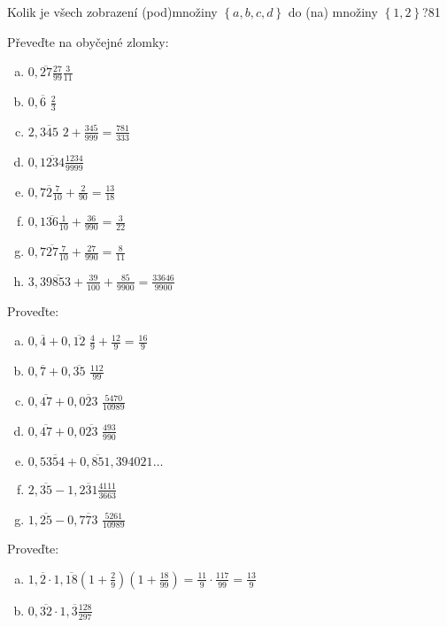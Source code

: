 \begin{example}[SÚM 174/46]
  Kolik je všech zobrazení (pod)množiny $\left\{a,b,c,d\right\}$ do (na) množiny $\left\{1,2\right\}$?\hfill \rm 81
\end{example}

\begin{example}[SÚM 106/20]
  Převeďte na obyčejné zlomky:
  \begin{enumerate}[a.]
    \item $0,\overline{27}$\hfill $\frac{27}{99}\frac{3}{11}$
    \item $0,\overline{6}$ \hfill $\frac{2}{3}$
    \item $2,\overline{345}$ \hfill $2+\frac{345}{999}=\frac{781}{333}$
    \item $0,\overline{1234}$\hfill $\frac{1234}{9999}$
    \item $0,7\overline{2}$\hfill $\frac{7}{10}+\frac{2}{90}=\frac{13}{18}$
    \item $0,1\overline{36}$\hfill $\frac{1}{10}+\frac{36}{990}=\frac{3}{22}$
    \item $0,7\overline{27}$\hfill $\frac{7}{10}+\frac{27}{990}=\frac{8}{11}$
    \item $3,39\overline{85}$\hfill $3+\frac{39}{100}+\frac{85}{9900}=\frac{33646}{9900}$
  \end{enumerate}
\end{example}

\begin{example}[SÚM 107/21]
  Proveďte:
  \begin{enumerate}[a.]
    \item $0,\overline{4}+0,\overline{12}$ \hfill $\frac{4}{9}+\frac{12}{9}=\frac{16}{9}$
    \item $0,\overline{7}+0,\overline{35}$  \hfill $\frac{112}{99}$
    \item $0,\overline{47}+0,\overline{023}$ \hfill $\frac{5470}{10989}$
    \item $0,\overline{47}+0,0\overline{23}$ \hfill $\frac{493}{990}$
    \item $0,5\overline{354}+0,\overline{85}$\hfill $1,394021\dots$
    \item $2,\overline{35}-1,\overline{231}$\hfill$ \frac{4111}{3663}$
    \item $1,\overline{25}-0,\overline{773}$ \hfill $\frac{5261}{10989}$
  \end{enumerate}
\end{example}

\begin{example}[SÚM 107/22*]
  Proveďte:
  \begin{enumerate}[a.]
    \item $1,\overline{2}\cdot 1,\overline{18}$\hfill $\left(1+\frac{2}{9}\right)\left(1+\frac{18}{99}\right)=\frac{11}{9}\cdot \frac{117}{99}=\frac{13}{9}$
    \item $0,\overline{32}\cdot 1,\overline{3}$\hfill $\frac{128}{297}$
  \end{enumerate}
\end{example}

